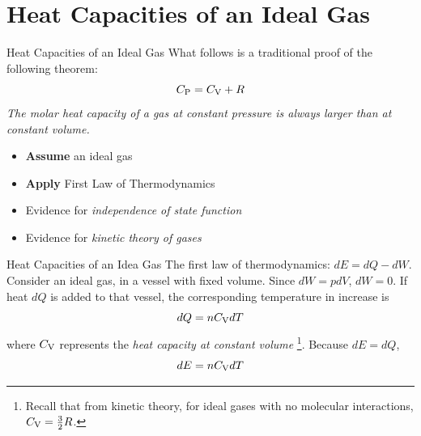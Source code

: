 \documentclass{beamer}
\begin{document}
\section{Heat Capacities of an Ideal Gas}

\begin{frame}{Heat Capacities of an Ideal Gas}
\small What follows is a traditional proof of the following theorem:
\begin{equation}
C_{\rm P} = C_{\rm V} + R
\end{equation}
\textit{The molar heat capacity of a gas at constant pressure is always larger than at constant volume.} \\ \vspace{0.5cm}
\begin{itemize}
\item \textbf{Assume} an ideal gas
\item \textbf{Apply} First Law of Thermodynamics
\item Evidence for \textit{independence of state function}
\item Evidence for \textit{kinetic theory of gases}
\end{itemize}
\end{frame}

\begin{frame}{Heat Capacities of an Idea Gas}
\small
The first law of thermodynamics: $dE = dQ - dW$.  Consider an ideal gas, in a vessel with fixed volume.  Since $dW = pdV$, $dW=0$.  If heat $dQ$ is added to that vessel, the corresponding temperature in increase is
\begin{equation}
dQ = n C_{\rm V} dT
\end{equation}
where $C_{\rm V}$ represents the \textit{heat capacity at constant volume} \footnote{Recall that from kinetic theory, for ideal gases with no molecular interactions, $C_{\rm V} = \frac{3}{2}R$.}.  Because $dE = dQ$,
\begin{equation}
dE = n C_{\rm V} dT
\end{equation}
\end{frame}
\end{document}
